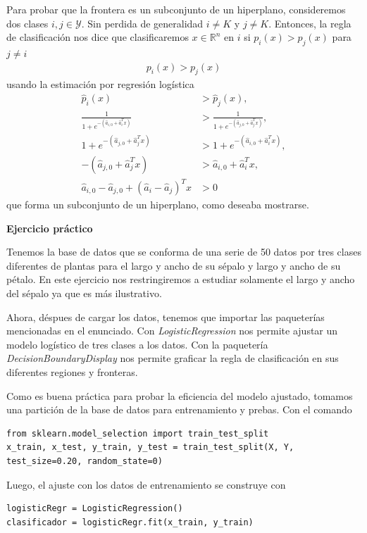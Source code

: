 \documentclass[a4paper, 11pt]{article}
\begin{document}
Para probar que la frontera es un subconjunto de un hiperplano, consideremos dos clases $i,j \in \mathcal{Y } $. Sin perdida de generalidad $i\neq K$ y $j\neq K$. Entonces, la regla de clasificación nos dice que clasificaremos $x\in \mathbb{R}^n $ en $i$ si $p_i(x) > p_j(x)$ para $j\neq i $ 
\begin{align*}
  p_i(x ) > p_j(x )
\end{align*}
usando la estimación por regresión logística
\begin{align*}
  \hat{p}_i (x ) &> \hat{p }_j(x ),\\
  \frac{1}{1+ e^{-(\hat{a}_{i,0} + \hat{a}_i^T x )}} & > \frac{1}{1+ e^{-(\hat{a}_{j,0} + \hat{a}_j^T x )}},\\
  1+ e^{-(\hat{a}_{j,0} + \hat{a}_j^T x )} &> 1+ e^{-(\hat{a}_{i,0} + \hat{a}_i^T x )},\\
  -(\hat{a}_{j,0} + \hat{a}_j^T x ) & > \hat{a}_{i,0} + \hat{a}_i^T x ,\\
  \hat{a }_{i,0} - \hat{a}_{j,0} + (\hat{a}_{i}-\hat{a }_j)^T x &> 0
\end{align*}
que forma un subconjunto de un hiperplano, como deseaba mostrarse.
\vspace{0.5cm}

\textbf{Ejercicio práctico}

Tenemos la base de datos que se conforma de una serie de 50 datos por tres clases diferentes de plantas para el largo y ancho de su sépalo y largo y ancho de su pétalo. En este ejercicio nos restringiremos a estudiar solamente el largo y ancho del sépalo ya que es más ilustrativo. 

Ahora, déspues de cargar los datos, tenemos que importar las paqueterías mencionadas en el enunciado. Con \textit{LogisticRegression} nos permite ajustar un modelo logístico de tres clases a los datos. Con la paquetería \textit{DecisionBoundaryDisplay} nos permite graficar la regla de clasificación en sus diferentes regiones y fronteras. 

Como es buena práctica para probar la eficiencia del modelo ajustado, tomamos una partición de la base de datos para entrenamiento y prebas. Con el comando
\begin{lstlisting}
from sklearn.model_selection import train_test_split
x_train, x_test, y_train, y_test = train_test_split(X, Y, test_size=0.20, random_state=0)
\end{lstlisting}

Luego, el ajuste con los datos de entrenamiento se construye con
\begin{lstlisting}
logisticRegr = LogisticRegression()
clasificador = logisticRegr.fit(x_train, y_train)
\end{lstlisting}
\end{document}
